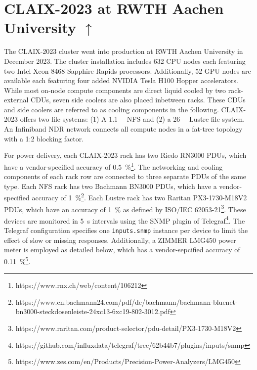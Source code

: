 \section[CLAIX-2023 at RWTH Aachen University]{CLAIX-2023 at RWTH Aachen University \hyperref[tab:examples-overview]{$\uparrow$}}
\label{sec:example-rwth-claix-2023}

The CLAIX-2023 cluster went into production at RWTH Aachen University in December 2023.
The cluster installation includes 632 CPU nodes each featuring two Intel Xeon 8468 Sapphire Rapids processors.
Additionally, 52 GPU nodes are available each featuring four added NVIDIA Tesla H100 Hopper accelerators.
While most on-node compute components are direct liquid cooled by two rack-external \acp{CDU}, seven side coolers are also placed inbetween racks.
These \acp{CDU} and side coolers are referred to as cooling components in the following.
CLAIX-2023 offers two file systems: (1) A \SI{1.1}{\peta\byte} NFS and (2) a \SI{26}{\peta\byte} Lustre file system.
An Infiniband NDR network connects all compute nodes in a fat-tree topology with a 1:2 blocking factor.

For power delivery, each CLAIX-2023 rack has two Riedo RN3000 \acp{PDU}, which have a vendor-specified accuracy of \SI{0.5}{\percent}\footnote{https://www.rnx.ch/web/content/106212}.
The networking and cooling components of each rack row are connected to three separate \acp{PDU} of the same type.
Each NFS rack has two Bachmann BN3000 \acp{PDU}, which have a vendor-specified accuracy of \SI{1}{\percent}\footnote{https://www.en.bachmann24.com/pdf/de/bachmann/bachmann-bluenet-bn3000-steckdosenleiste-24xc13-6xc19-802-3012.pdf}.
Each Lustre rack has two Raritan PX3-1730-M18V2 \acp{PDU}, which have an accuracy of \SI{1}{\percent} as defined by ISO/IEC 62053-21\footnote{https://www.raritan.com/product-selector/pdu-detail/PX3-1730-M18V2}.
These devices are monitored in \SI{5}{\second} intervals using the SNMP plugin of Telegraf\footnote{https://github.com/influxdata/telegraf/tree/62b44b7/plugins/inputs/snmp}.
The Telegraf configuration specifies one \texttt{inputs.snmp} instance per device to limit the effect of slow or missing responses.
Additionally, a ZIMMER LMG450 power meter is employed as detailed below, which has a vendor-sepcified accuracy of \SI{0.11}{\percent}\footnote{https://www.zes.com/en/Products/Precision-Power-Analyzers/LMG450}.

